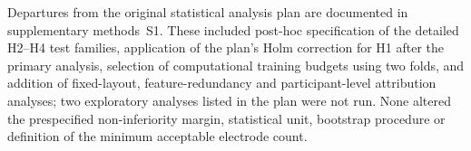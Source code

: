 Departures from the original statistical analysis plan are documented in supplementary methods~S1. These included post-hoc specification of the detailed H2--H4 test families, application of the plan's Holm correction for H1 after the primary analysis, selection of computational training budgets using two folds, and addition of fixed-layout, feature-redundancy and participant-level attribution analyses; two exploratory analyses listed in the plan were not run. None altered the prespecified non-inferiority margin, statistical unit, bootstrap procedure or definition of the minimum acceptable electrode count.
